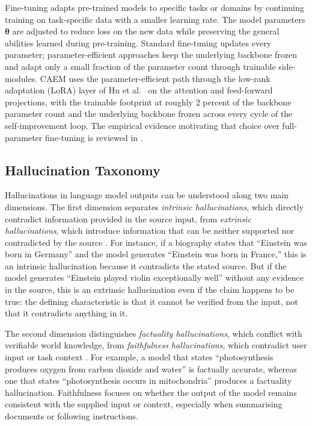 Fine-tuning adapts pre-trained models to specific tasks or domains by continuing training on task-specific data with a smaller learning rate. The model parameters $\boldsymbol{\theta}$ are adjusted to reduce loss on the new data while preserving the general abilities learned during pre-training. Standard fine-tuning updates every parameter; parameter-efficient approaches keep the underlying backbone frozen and adapt only a small fraction of the parameter count through trainable side-modules. CAEM uses the parameter-efficient path through the low-rank adaptation (LoRA) layer of Hu et al.~\cite{hu2022lora} on the attention and feed-forward projections, with the trainable footprint at roughly $2$ percent of the backbone parameter count and the underlying backbone frozen across every cycle of the self-improvement loop. The empirical evidence motivating that choice over full-parameter fine-tuning is reviewed in .

\subsection{Hallucination Taxonomy}
\label{sec:hallucination-taxonomy}

Hallucinations in language model outputs can be understood along two main dimensions. The first dimension separates \textit{intrinsic hallucinations}, which directly contradict information provided in the source input, from \textit{extrinsic hallucinations}, which introduce information that can be neither supported nor contradicted by the source \cite{ji2023survey}. For instance, if a biography states that ``Einstein was born in Germany'' and the model generates ``Einstein was born in France,'' this is an intrinsic hallucination because it contradicts the stated source. But if the model generates ``Einstein played violin exceptionally well'' without any evidence in the source, this is an extrinsic hallucination even if the claim happens to be true: the defining characteristic is that it cannot be verified from the input, not that it contradicts anything in it.

The second dimension distinguishes \textit{factuality hallucinations}, which conflict with verifiable world knowledge, from \textit{faithfulness hallucinations}, which contradict user input or task context \cite{huang2025survey}. For example, a model that states ``photosynthesis produces oxygen from carbon dioxide and water'' is factually accurate, whereas one that states ``photosynthesis occurs in mitochondria'' produces a factuality hallucination. Faithfulness focuses on whether the output of the model remains consistent with the supplied input or context, especially when summarising documents or following instructions.

